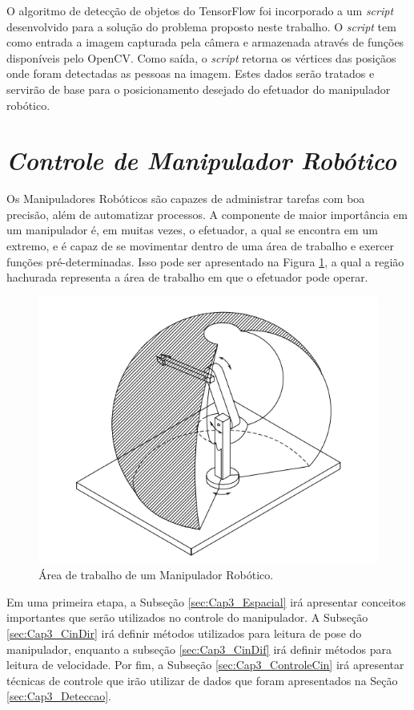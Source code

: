 O algoritmo de detecção de objetos do TensorFlow foi incorporado a um \textit{script} desenvolvido para a solução do problema proposto neste trabalho. O \textit{script} tem como entrada a imagem capturada pela câmera e armazenada através de funções disponíveis pelo OpenCV. Como saída, o \textit{script} retorna os vértices das posiçãos onde foram detectadas as pessoas na imagem. Estes dados serão tratados e servirão de base para o posicionamento desejado do efetuador do manipulador robótico.


\section{\textit{Controle de Manipulador Robótico}}\label{sec:Cap3_Controle}

Os Manipuladores Robóticos são capazes de administrar tarefas com boa precisão, além de automatizar processos. A componente de maior importância em um manipulador é, em muitas vezes, o efetuador, a qual se encontra em um extremo, e é capaz de se movimentar dentro de uma área de trabalho e exercer funções pré-determinadas. Isso pode ser apresentado na Figura \ref{fig:workspace}, a qual a região hachurada representa a área de trabalho em que o efetuador pode operar.

\begin{figure}[h!]
\centering
\includegraphics[width=0.7\columnwidth]{Imagens/workspace.PNG}
\caption{Área de trabalho de um Manipulador Robótico. \cite{siciliano2010robotics}}
\label{fig:workspace}
\end{figure}

Em uma primeira etapa, a Subseção \ref{sec:Cap3_Espacial} irá apresentar conceitos importantes que serão utilizados no controle do manipulador. A Subseção \ref{sec:Cap3_CinDir} irá definir métodos utilizados para leitura de pose do manipulador, enquanto a subseção \ref{sec:Cap3_CinDif} irá definir métodos para leitura de velocidade. Por fim, a Subseção \ref{sec:Cap3_ControleCin} irá apresentar técnicas de controle que irão utilizar de dados que foram apresentados na Seção \ref{sec:Cap3_Deteccao}.

